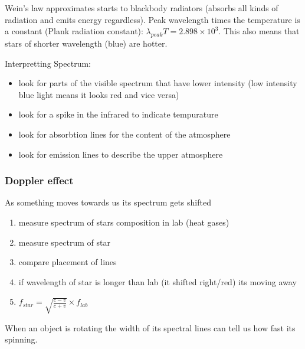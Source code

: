 Wein's law approximates starts to blackbody radiators (absorbs all kinds of radiation and emits energy regardless). Peak wavelength times the temperature is a constant (Plank radiation constant): $\lambda_{peak}T = 2.898\times10^3$. This also means that stars of shorter wavelength (blue) are hotter.

Interpretting Spectrum:
\begin{itemize}
\item look for parts of the visible spectrum that have lower intensity (low intensity blue light means it looks red and vice versa)
\item look for a spike in the infrared to indicate tempurature
\item look for absorbtion lines for the content of the atmosphere
\item look for emission lines to describe the upper atmosphere
\end{itemize}

\subsubsection{Doppler effect}
As something moves towards us its spectrum gets shifted
\begin{enumerate}
\item measure spectrum of stars composition in lab (heat gases)
\item measure spectrum of star
\item compare placement of lines
\item if wavelength of star is longer than lab (it shifted right/red) its moving away
\item $f_{star} = \sqrt{\frac{c-v}{c+v}} \times f_{lab}$
\end{enumerate}

When an object is rotating the width of its spectral lines can tell us how fast its spinning.
